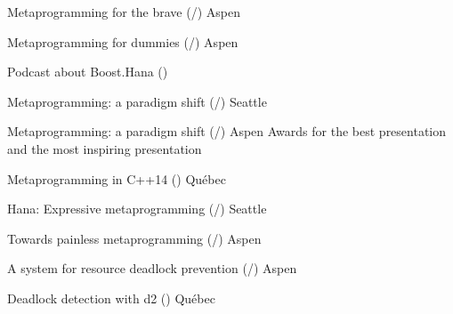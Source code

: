 \documentclass[10pt]{moderncv}
\newcommand{\myhref}[3][blue]{\href{#2}{\color{#1}{#3}}}
\begin{document}
        {Metaprogramming for the brave (\myhref{http://ldionne.github.io/cppnow-2016-metaprogramming-for-the-brave}{slides}/\myhref{https://youtu.be/UXwWXHrvTug}{video})}
        {\myhref{http://www.cppnow.org}{C++Now}}{Aspen}{}{}{}

        {Metaprogramming for dummies (\myhref{http://ldionne.github.io/cppnow-2016-metaprogramming-for-dummies}{slides}/\myhref{https://youtu.be/a1doqFAumCk}{video})}
        {\myhref{http://www.cppnow.org}{C++Now}}{Aspen}{}{}{}

        {Podcast about Boost.Hana (\myhref{http://cppcast.com/2016/04/louis-dionne/}{audio})}
        {\myhref{http://cppcast.com}{CppCast}}{}{}{}{}

        {Metaprogramming: a paradigm shift (\myhref{http://ldionne.github.io/hana-cppcon-2015}{slides}/\myhref{https://youtu.be/cg1wOINjV9U}{video})}
        {\myhref{http://cppcon.org}{CppCon}}{Seattle}{}{}{}

        {Metaprogramming: a paradigm shift (\myhref{http://ldionne.github.io/hana-cppnow-2015}{slides}/\myhref{http://youtu.be/Z2ABRaQiFHs}{video})}
        {\myhref{http://www.cppnow.org}{C++Now}}{Aspen}{}
        {Awards for the best presentation and the most inspiring presentation}

        {Metaprogramming in C++14 (\myhref{http://ldionne.github.io/hana-opencode-xxii}{french only slides})}
        {\myhref{http://www.opencode.ca}{OpenCode XXII}}{Québec}{}{}

        {Hana: Expressive metaprogramming (\myhref{http://ldionne.github.io/hana-cppcon-2014/}{slides}/\myhref{https://www.youtube.com/watch?v=L2SktfaJPuU}{video})}
        {\myhref{http://cppcon.org}{CppCon}}{Seattle}{}{}

        {Towards painless metaprogramming (\myhref{http://ldionne.github.io/mpl11-cppnow-2014}{slides}/\myhref{https://www.youtube.com/watch?v=8c0aWLuEO0Y}{video})}
        {\myhref{http://www.cppnow.org}{C++Now}}{Aspen}{}{}

        {A system for resource deadlock prevention (\myhref{http://ldionne.github.io/d2-cppnow-2013}{slides}/\myhref{https://www.youtube.com/watch?v=Re67U4zAN-M}{video})}
        {\myhref{http://www.cppnow.org}{C++Now}}{Aspen}{}{}

        {Deadlock detection with d2 (\myhref{http://ldionne.github.io/d2-opencode12}{slides})}
        {\myhref{http://www.opencode.ca}{OpenCode XII}}{Québec}{}{}
\end{document}
